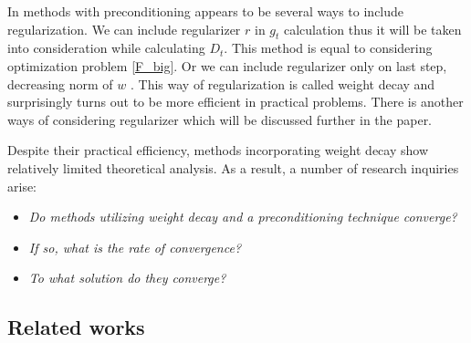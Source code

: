\documentclass[USenglish]{article}
\theoremstyle{dgthm}
\theoremstyle{dgdef}
\begin{document}
In methods with preconditioning appears to be several ways to include regularization.
We can include regularizer $r$ in $g_t$ calculation thus it will be taken into consideration while calculating $D_t$. This method is equal to considering optimization problem \eqref{F_big}.
Or we can include regularizer only on last step, decreasing norm of $w$ \citep{loshchilov2017decoupled}.
This way of regularization is called weight decay and surprisingly turns out to be more efficient in practical problems.
There is another ways of considering regularizer which will be discussed further in the paper.

Despite their practical efficiency, methods incorporating weight decay show relatively limited theoretical analysis.
As a result, a number of research inquiries arise:
\begin{itemize}
    \item \textit{Do methods utilizing weight decay and a preconditioning technique converge?}
    \item \textit{If so, what is the rate of convergence?}
    \item \textit{To what solution do they converge?}
\end{itemize}


\subsection{Related works}
\end{document}

